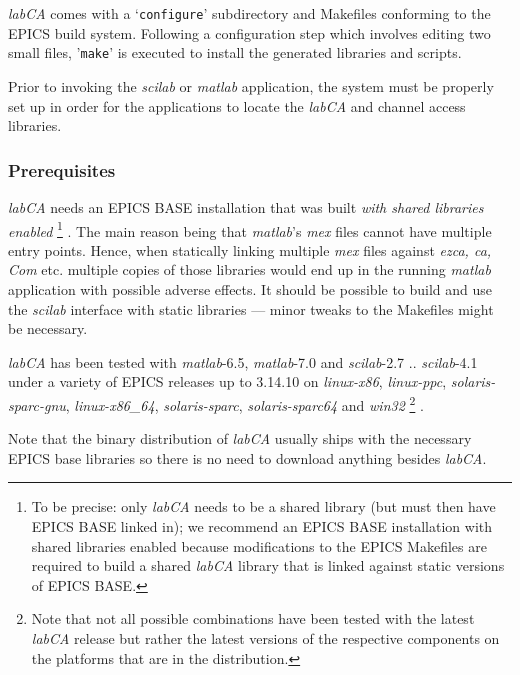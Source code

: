 \documentclass{article}
\newcommand{\sca}{\ita{labCA}}
\newcommand{\scilab}{\ita{scilab}}
\newcommand{\matlab}{\ita{matlab}}
\newcommand{\windoze}{\ita{win32}}
\newcommand{\com}[1]{{\tt #1}}
\newcommand{\pbrkf}{\pagebreak}
\newcommand{\ita}[1]{\emph{#1}}
\renewcommand{\pbrkf}{}
\begin{document}
\sca{} comes with a `\com{configure}' subdirectory and Makefiles conforming to the
EPICS build system. Following a configuration step which involves editing
two small files, '\com{make}' is executed to install the generated libraries
and scripts.

Prior to invoking the \scilab{} or \matlab{} application, the system
must be properly set up in order for the applications to locate the
\sca{} and channel access libraries.

\subsubsection{Prerequisites}
\sca{} needs an EPICS BASE installation that was built \ita{with shared
libraries enabled}%
\footnote{
To be precise: only \sca{} needs to be a shared library (but must then have
EPICS BASE linked in); we recommend an EPICS BASE installation with
shared libraries enabled because modifications to the EPICS Makefiles
are required to build a shared \sca{} library that is linked against
static versions of EPICS BASE.}%
.
The main reason being that \matlab's \ita{mex} files cannot
have multiple entry points. Hence, when statically linking multiple \ita{mex}
files against \ita{ezca, ca, Com} etc. multiple copies of those libraries
would end up in the running \matlab{} application with possible adverse
effects. It should be possible to build and use the \scilab{} interface
with static libraries --- minor tweaks to the Makefiles might be necessary.

\sca{} has been tested with \matlab-6.5, \matlab-7.0 and \scilab-2.7 .. \scilab-4.1
under a variety of EPICS releases up to 3.14.10 on \ita{linux-x86},
\ita{linux-ppc}, \ita{solaris-sparc-gnu},
\ita{linux-x86\_64}, \ita{solaris-sparc}, \ita{solaris-sparc64}
and \windoze%
\footnote{
Note that not all possible combinations have been tested with the latest \sca{} release
but rather the latest versions of the respective components on the platforms
that are in the distribution.}%
.

Note that the binary distribution of \sca{} usually ships with the
necessary EPICS base libraries so there is no need to download anything
besides \sca.

\pbrkf
\end{document}
